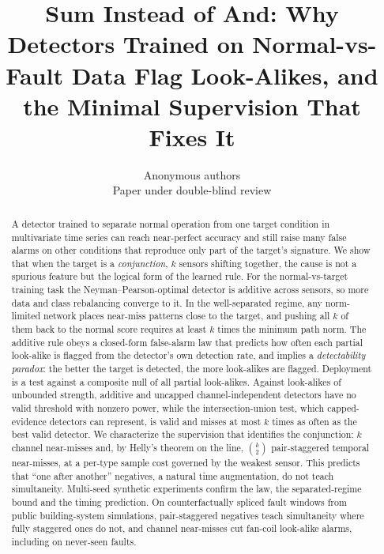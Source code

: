 \documentclass{article}
\title{Sum Instead of And: Why Detectors Trained on Normal-vs-Fault Data Flag Look-Alikes, and the Minimal Supervision That Fixes It}
\author{Anonymous authors\\Paper under double-blind review}
\theoremstyle{definition}
\theoremstyle{remark}
\renewcommand{\1}{\mathbf{1}}
\begin{document}
\maketitle

\begin{abstract}
A detector trained to separate normal operation from one target condition in multivariate time series can reach near-perfect accuracy and still raise many false alarms on other conditions that reproduce only part of the target's signature. We show that when the target is a \emph{conjunction}, $k$ sensors shifting together, the cause is not a spurious feature but the logical form of the learned rule. For the normal-vs-target training task the Neyman--Pearson-optimal detector is additive across sensors, so more data and class rebalancing converge to it. In the well-separated regime, any norm-limited network places near-miss patterns close to the target, and pushing all $k$ of them back to the normal score requires at least $k$ times the minimum path norm. The additive rule obeys a closed-form false-alarm law that predicts how often each partial look-alike is flagged from the detector's own detection rate, and implies a \emph{detectability paradox}: the better the target is detected, the more look-alikes are flagged. Deployment is a test against a composite null of all partial look-alikes. Against look-alikes of unbounded strength, additive and uncapped channel-independent detectors have no valid threshold with nonzero power, while the intersection-union test, which capped-evidence detectors can represent, is valid and misses at most $k$ times as often as the best valid detector. We characterize the supervision that identifies the conjunction: $k$ channel near-misses and, by Helly's theorem on the line, $\binom{k}{2}$ pair-staggered temporal near-misses, at a per-type sample cost governed by the weakest sensor. This predicts that ``one after another'' negatives, a natural time augmentation, do not teach simultaneity. Multi-seed synthetic experiments confirm the law, the separated-regime bound and the timing prediction. On counterfactually spliced fault windows from public building-system simulations, pair-staggered negatives teach simultaneity where fully staggered ones do not, and channel near-misses cut fan-coil look-alike alarms, including on never-seen faults.
\end{abstract}

\end{document}
